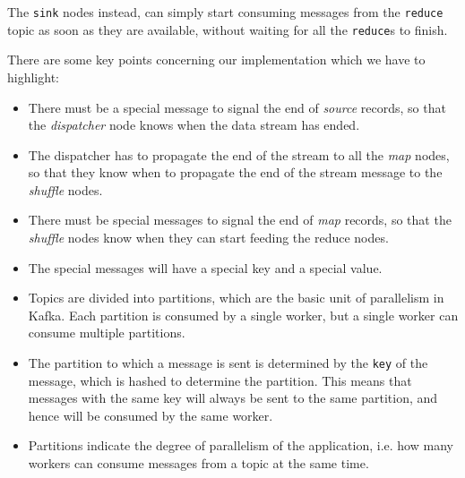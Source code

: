 The \texttt{sink} nodes instead, can simply start consuming messages from the \texttt{reduce} topic as soon as they are available, without waiting for all the \texttt{reduce}s to finish.

There are some key points concerning our implementation which we have to highlight:
\begin{itemize}
   \item There must be a special message to signal the end of \textit{source} records, so that the \textit{dispatcher} node knows when the data stream has ended.
   \item The dispatcher has to propagate the end of the stream to all the \textit{map} nodes, so that they know when to propagate the end of the stream message to the \textit{shuffle} nodes.
   \item There must be special messages to signal the end of \textit{map} records, so that the \textit{shuffle} nodes know when they can start feeding the reduce nodes.
   \item The special messages will have a special key and a special value.
   \item Topics are divided into partitions, which are the basic unit of parallelism in Kafka. Each partition is consumed by a single worker, but a single worker can consume multiple partitions.
   \item The partition to which a message is sent is determined by the \texttt{key} of the message, which is hashed to determine the partition. This means that messages with the same key will always be sent to the same partition, and hence will be consumed by the same worker.
   \item Partitions indicate the degree of parallelism of the application, i.e. how many workers can consume messages from a topic at the same time.
\end{itemize} 


